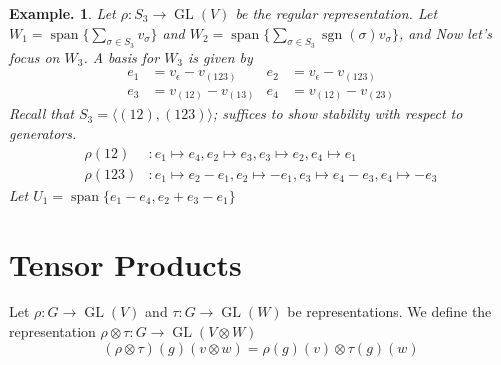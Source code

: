 \documentclass[11pt, a4paper]{memoir}
\theoremstyle{change}
\theoremstyle{plain}
\theoremstyle{nonumberplain}
\newtheorem{example}{Example.}
\DeclareMathOperator{\GL}{GL}
\DeclareMathOperator{\spn}{span}
\DeclareMathOperator{\sgn}{sgn}
\numberwithin{equation}{section}
\begin{document}
\begin{example}
    Let $\rho:S_3\to\GL(V)$ be the regular representation.
    Let $W_1=\spn\{\sum_{\sigma\in S_3}v_\sigma\}$ and $W_2=\spn\{\sum_{\sigma\in S_3}\sgn(\sigma)v_\sigma\}$, and
    Now let's focus on $W_3$.
    A basis for $W_3$ is given by
    \begin{align*}
        e_1&=v_\epsilon-v_{(123)} & e_2 &= v_\epsilon-v_{(123)}\\
        e_3 &= v_{(12)}-v_{(13)} & e_4 &= v_{(12)}-v_{(23)}
    \end{align*}
    Recall that $S_3=\langle(12),(123)\rangle$; suffices to show stability with respect to generators.
    \begin{align*}
        \rho(12) &: e_1\mapsto e_4,e_2\mapsto e_3, e_3\mapsto e_2,e_4\mapsto e_1\\
        \rho(123) & : e_1\mapsto e_2-e_1, e_2\mapsto -e_1,e_3\mapsto e_4-e_3, e_4\mapsto -e_3
    \end{align*}
    Let $U_1=\spn\{e_1-e_4,e_2+e_3-e_1\}$
\end{example}
\section{Tensor Products}
Let $\rho:G\to\GL(V)$ and $\tau:G\to\GL(W)$ be representations.
We define the representation $\rho\otimes\tau:G\to\GL(V\otimes W)$
\begin{equation*}
    (\rho\otimes\tau)(g)(v\otimes w)=\rho(g)(v)\otimes\tau(g)(w)
\end{equation*}
\end{document}
